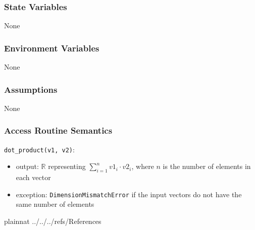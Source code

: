 \documentclass[12pt, titlepage]{article}
\begin{document}
\subsubsection{State Variables}
None

\subsubsection{Environment Variables}

None

\subsubsection{Assumptions}

None

\subsubsection{Access Routine Semantics}

\noindent \texttt{dot\_product(v1, v2)}:
\begin{itemize}
  \item output: $\mathbb{R}$ representing $\sum_{i=1}^{n} v1_i \cdot v2_i$, where $n$ is the number of elements in each vector
  \item exception: \texttt{DimensionMismatchError} if the input vectors do not have the same number of elements
\end{itemize}


\newpage

 {plainnat}
 {../../../refs/References}

\newpage

\newpage{}
\end{document}
